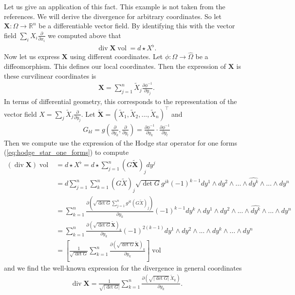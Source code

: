 \documentclass[12pt,a4paper]{article}
\numberwithin{equation}{subsection}
\numberwithin{lemma}{subsection}
\theoremstyle{definition}
\DeclareMathOperator{\diver}{div}
\DeclareMathOperator{\vol}{vol}
\newcommand{\real}{\mathbb{R}}
\begin{document}
Let us give an application of this fact. This example is not taken from the 
references. We will derive the divergence for arbitrary coordinates. 
So let $\mathbf{X}: \Omega \rightarrow \real^n$ be a differentiable vector field. By 
identifying this with the vector field $\sum_i X_i \frac{\partial}{\partial x_i}
$ we computed above that 
\begin{align*}
    \diver \mathbf{X} \vol = d \star X^\flat.
\end{align*}
Now let us express $\mathbf{X}$ using different coordinates. 
Let $\phi: \Omega \rightarrow \hat{\Omega}$ be a diffeomorphism. 
This defines our local coordinates. Then the expression of $\mathbf{X}$ is
these curvilinear coordinates is
\begin{align*}
    \mathbf{X} = \sum_{j=1}^n \tilde{X}_j 
        \frac{\partial \phi^{-1}}{\partial y_j}.
\end{align*}
In terms of differential geometry, this corresponds to the representation of the vector field 
$X = \sum_j \tilde{X}_j \frac{\partial}{\partial y_j}$. 
Let $\tilde{\mathbf{X}} = (\tilde{X}_1, \tilde{X}_2, ..., \tilde{X}_n)^\top$ 
and 
\begin{align*}
    G_{kl} = g(\frac{\partial}{\partial y_k}, \frac{\partial}{\partial y_l})
        = \frac{\partial \phi^{-1}}{\partial y_k} \cdot 
            \frac{\partial \phi^{-1}}{\partial y_l}
\end{align*}
Then we compute use the expression of the Hodge star operator 
for one forms (\ref{eq:hodge_star_one_forms}) to compute
\begin{align*}
    (\diver \mathbf{X}) \vol 
    &= d \star X^\flat 
    = d \star \sum_{j=1}^n (G \tilde{\mathbf{X}})_j dy^j 
    \\ &= d \sum_{j=1}^n \sum_{k=1}^n (G \tilde{X})_j 
        \sqrt{ \det G} g^{jk} (-1)^{k-1} dy^1 \wedge dy^2 \wedge ... \wedge 
        \widehat{dy^k} \wedge ... \wedge dy^n 
    \\ &= \sum_{k=1}^n \frac{\partial
        (\sqrt{ \det G} \sum_{j=1}^n g^{jk} (G \tilde{X})_j )}
        {\partial y_k} (-1)^{k-1} dy^k \wedge dy^1 \wedge dy^2 \wedge ... \wedge 
        \widehat{dy^k} \wedge ... \wedge dy^n 
    \\ &= \sum_{k=1}^n \frac{\partial (\sqrt{ \det G}  \tilde{\mathbf{X}})_k }
        {\partial y_k} (-1)^{2(k-1)} dy^1 \wedge dy^2 \wedge ... \wedge 
        dy^k \wedge ... \wedge dy^n
    \\ &= \left[ \frac{1}{\sqrt{ \det G}} \sum_{k=1}^n 
        \frac{\partial (\sqrt{ \det G}  \tilde{\mathbf{X}})_k }{\partial y_k}
        \right] \vol
\end{align*}
and we find the well-known expression for the divergence in general coordinates
\begin{align*}
    \diver \mathbf{X} = \frac{1}{\sqrt{ |\det G|}} \sum_{k=1}^n 
        \frac{\partial (\sqrt{ |\det G|} \, \tilde{X}_k )}{\partial y_k}.
\end{align*}
\end{document}
